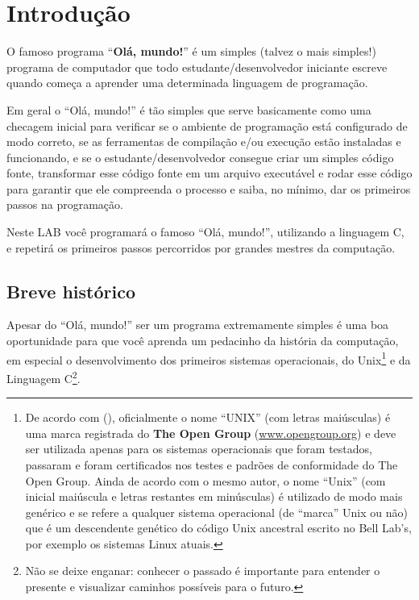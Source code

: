\section{Introdução}
\label{sec:intro}

O famoso programa ``\textbf{Olá, mundo!}'' é um simples (talvez o mais simples!)
programa de computador que todo estudante/desenvolvedor iniciante escreve quando
começa a aprender uma determinada linguagem de programação.

Em geral o ``Olá, mundo!'' é tão simples que serve basicamente como uma checagem
inicial para verificar se o ambiente de programação está configurado de modo
correto, se as ferramentas de compilação e/ou execução estão instaladas e
funcionando, e se o estudante/desenvolvedor consegue criar um simples código
fonte, transformar esse código fonte em um arquivo executável e rodar esse
código para garantir que ele compreenda o processo e saiba, no mínimo, dar os
primeiros passos na programação.

Neste LAB você programará o famoso ``Olá, mundo!'', utilizando a linguagem C, e
repetirá os primeiros passos percorridos por grandes mestres da computação.


\subsection{Breve histórico}
\label{sec:intro:hist}

Apesar do ``Olá, mundo!'' ser um programa extremamente simples é uma boa
oportunidade para que você aprenda um pedacinho da história da computação, em
especial o desenvolvimento dos primeiros sistemas operacionais, do
Unix\footnote{De acordo com 
(\citeyear{raymond2004}), oficialmente o nome ``UNIX'' (com letras maiúsculas) é
uma marca registrada do \textbf{The Open Group} (\url{www.opengroup.org}) e deve
ser utilizada apenas para os sistemas operacionais que foram testados, passaram
e foram certificados nos testes e padrões de conformidade do The Open
Group. Ainda de acordo com o mesmo autor, o nome ``Unix'' (com inicial maiúscula
e letras restantes em minúsculas) é utilizado de modo mais genérico e se refere
a qualquer sistema operacional (de ``marca'' Unix ou não) que é um descendente
genético do código Unix ancestral escrito no Bell Lab's, por exemplo os sistemas
Linux atuais.} e da Linguagem C\footnote{Não se deixe enganar: conhecer o
passado é importante para entender o presente e visualizar caminhos possíveis
para o futuro.}.


